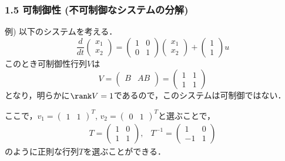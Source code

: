 \begin{frame}[t]
\frametitle{1.5 可制御性 (不可制御なシステムの分解)}
例) 以下のシステムを考える．
\begin{equation}
 \frac{d}{dt}
  \left(
   \begin{array}{c}
    x_1 \\
    x_2
   \end{array}
  \right) =
  \left(
   \begin{array}{cc}
    1 & 0 \\
    0 & 1
   \end{array}
  \right)
  \left(
   \begin{array}{c}
    x_1 \\
    x_2
   \end{array}
  \right) +
  \left(
   \begin{array}{c}
    1 \\
    1
   \end{array}
  \right) u
\end{equation}
このとき可制御性行列$V$は
\begin{equation}
 V =
  \left(
   \begin{array}{cc}
    B & AB\\
   \end{array}
  \right) =
  \left(
   \begin{array}{cc}
    1 & 1 \\
    1 & 1
   \end{array}
  \right)
\end{equation}
となり，明らかに$\rank V = 1$であるので，このシステムは可制御ではない．

ここで，$v_1 = (\begin{array}{cc}1 & 1\end{array})^T$,
$v_2 = (\begin{array}{cc}0 & 1\end{array})^T$と選ぶことで，
\begin{equation}
 \begin{array}{cc}
  T =
   \left(
    \begin{array}{cc}
     1 & 0 \\
     1 & 1
    \end{array}
   \right),
   &
  T^{-1} =
   \left(
    \begin{array}{cc}
     1 & 0 \\
     -1 & 1
    \end{array}
   \right)
 \end{array}
\end{equation}
のように正則な行列$T$を選ぶことができる．
\end{frame}


